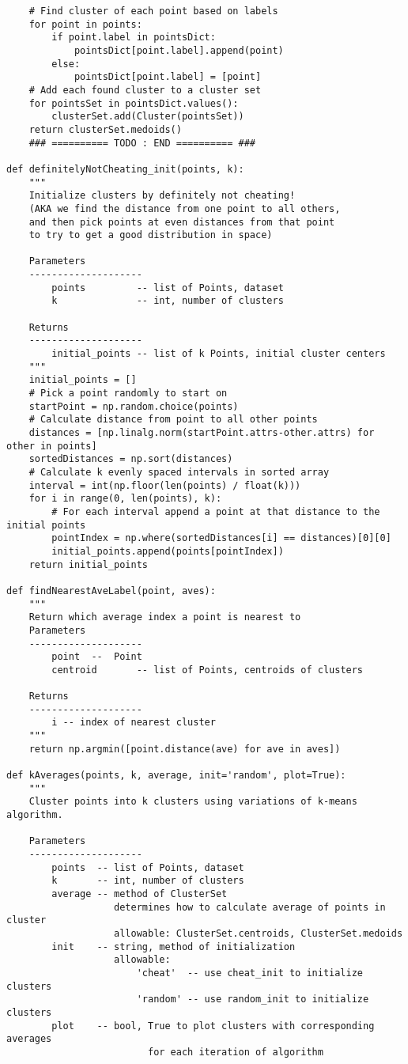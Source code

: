 \documentclass[11pt]{article}
\begin{document}
\begin{verbatim}
    # Find cluster of each point based on labels
    for point in points:
        if point.label in pointsDict:
            pointsDict[point.label].append(point)
        else:
            pointsDict[point.label] = [point]
    # Add each found cluster to a cluster set
    for pointsSet in pointsDict.values():
        clusterSet.add(Cluster(pointsSet))
    return clusterSet.medoids()
    ### ========== TODO : END ========== ###

def definitelyNotCheating_init(points, k):
    """
    Initialize clusters by definitely not cheating!
    (AKA we find the distance from one point to all others,
    and then pick points at even distances from that point
    to try to get a good distribution in space)
    
    Parameters
    --------------------
        points         -- list of Points, dataset
        k              -- int, number of clusters
    
    Returns
    --------------------
        initial_points -- list of k Points, initial cluster centers
    """
    initial_points = []
    # Pick a point randomly to start on
    startPoint = np.random.choice(points)
    # Calculate distance from point to all other points
    distances = [np.linalg.norm(startPoint.attrs-other.attrs) for other in points]
    sortedDistances = np.sort(distances)
    # Calculate k evenly spaced intervals in sorted array
    interval = int(np.floor(len(points) / float(k)))
    for i in range(0, len(points), k):
        # For each interval append a point at that distance to the initial points
        pointIndex = np.where(sortedDistances[i] == distances)[0][0]
        initial_points.append(points[pointIndex])
    return initial_points

def findNearestAveLabel(point, aves):
    """
    Return which average index a point is nearest to
    Parameters
    --------------------
        point  --  Point
        centroid       -- list of Points, centroids of clusters
    
    Returns
    --------------------
        i -- index of nearest cluster
    """
    return np.argmin([point.distance(ave) for ave in aves])

def kAverages(points, k, average, init='random', plot=True):
    """
    Cluster points into k clusters using variations of k-means algorithm.
    
    Parameters
    --------------------
        points  -- list of Points, dataset
        k       -- int, number of clusters
        average -- method of ClusterSet
                   determines how to calculate average of points in cluster
                   allowable: ClusterSet.centroids, ClusterSet.medoids
        init    -- string, method of initialization
                   allowable: 
                       'cheat'  -- use cheat_init to initialize clusters
                       'random' -- use random_init to initialize clusters
        plot    -- bool, True to plot clusters with corresponding averages
                         for each iteration of algorithm
    

\end{verbatim}
\end{document}
